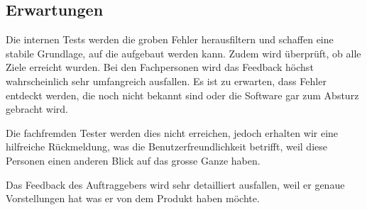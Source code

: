 \subsection{Erwartungen} \label{subsec:validierung}
Die internen Tests werden die groben Fehler herausfiltern und schaffen eine stabile Grundlage, auf die aufgebaut werden kann. Zudem wird überprüft, ob alle Ziele erreicht wurden.
Bei den Fachpersonen wird das Feedback höchst wahrscheinlich sehr umfangreich ausfallen. Es ist zu erwarten, dass Fehler entdeckt werden, die noch nicht bekannt sind oder die Software gar zum Absturz gebracht wird. 

Die fachfremden Tester werden dies nicht erreichen, jedoch erhalten wir eine hilfreiche Rückmeldung, was die Benutzerfreundlichkeit betrifft, weil diese Personen einen anderen Blick auf das grosse Ganze haben. 

Das Feedback des Auftraggebers wird sehr detailliert ausfallen, weil er genaue Vorstellungen hat was er von dem Produkt haben möchte.





